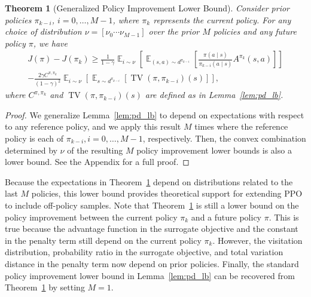 \documentclass{article}
\newtheorem{theorem}{Theorem}
\begin{document}
\begin{theorem}[Generalized Policy Improvement Lower Bound]\label{thm:pd_lb_pimix}
Consider prior policies $\pi_{k-i}$, $i=0,\ldots,M-1$, where $\pi_k$ represents the current policy. For any choice of distribution $\nu = \left[ \nu_0 \cdots \nu_{M-1} \right]$ over the prior $M$ policies and any future policy $\pi$, we have
\begin{multline}
J(\pi) - J(\pi_k) \geq \frac{1}{1-\gamma} \mathop{\mathbb{E}}_{i \sim \nu} \left[ \mathop{\mathbb{E}}_{(s,a) \sim d^{\pi_{k-i}}} \left[ \frac{\pi(a \mid s)}{\pi_{k-i}(a \mid s)} A^{\pi_k}(s,a) \right] \right] \\ - \frac{2 \gamma C^{\pi,\pi_k}}{(1-\gamma)^2} \mathop{\mathbb{E}}_{i \sim \nu} \left[  \mathop{\mathbb{E}}_{s \sim d^{\pi_{k-i}}} \left[ \operatorname{TV}(\pi,\pi_{k-i})(s) \right] \right],
\end{multline}
where $C^{\pi,\pi_k}$ and $\operatorname{TV}(\pi,\pi_{k-i})(s)$ are defined as in Lemma~\ref{lem:pd_lb}. 
\end{theorem}

\begin{proof}
We generalize Lemma~\ref{lem:pd_lb} to depend on expectations with respect to any reference policy, and we apply this result $M$ times where the reference policy is each of $\pi_{k-i}, i=0,\ldots,M-1$, respectively. Then, the convex combination determined by $\nu$ of the resulting $M$ policy improvement lower bounds is also a lower bound. See the Appendix for a full proof.
\end{proof}
Because the expectations in Theorem~\ref{thm:pd_lb_pimix} depend on distributions related to the last $M$ policies, this lower bound provides theoretical support for extending PPO to include off-policy samples. Note that Theorem~\ref{thm:pd_lb_pimix} is still a lower bound on the policy improvement between the current policy $\pi_k$ and a future policy $\pi$. This is true because the advantage function in the surrogate objective and the constant in the penalty term still depend on the current policy $\pi_k$. However, the visitation distribution, probability ratio in the surrogate objective, and total variation distance in the penalty term now depend on prior policies. Finally, the standard policy improvement lower bound in Lemma~\ref{lem:pd_lb} can be recovered from Theorem~\ref{thm:pd_lb_pimix} by setting $M=1$.
\end{document}
